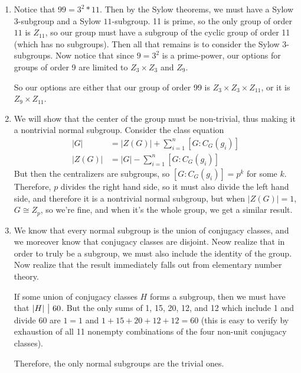 \documentclass[12pt, twosided]{article}
\begin{document}
\begin{enumerate}
\begin{proof}
    Now notice that the former case is just \(Z_3 \times Z_2\), and in the second case \(ab\) is an element of order 6. Then, since there is nowhere else to send \(ba\), we have the result we sought.
  \end{proof}
\item Notice that \(99 = 3^2 * 11\). Then by the Sylow theorems, we must have a Sylow \(3\)-subgroup and a Sylow \(11\)-subgroup. 11 is prime, so the only group of order \(11\) is \(Z_{11}\), so our group must have a subgroup of the cyclic group of order 11 (which has no subgroups). Then all that remains is to consider the Sylow 3-subgroups. Now notice that since \(9 = 3^2\) is a prime-power, our options for groups of order 9 are limited to \(Z_3 \times Z_3\) and \(Z_9\).

  So our options are either that our group of order 99 is \(Z_3 \times Z_3 \times Z_{11}\), or it is \(Z_9 \times Z_{11}\).
\item We will show that the center of the group must be non-trivial, thus making it a nontrivial normal subgroup. Consider the class equation
  \begin{align*}
    |G| &= |Z(G)| + \sum_{i=1}^n[G:C_G(g_i)] \\
    |Z(G)| &= |G| - \sum_{i=1}^n[G:C_G(g_i)]
  \end{align*}
  But then the centralizers are subgroups, so \([G:C_G(g_i)]= p^k\) for some \(k\). Therefore, \(p\) divides the right hand side, so it must also divide the left hand side, and therefore it is a nontrivial normal subgroup, but when \(|Z(G)| = 1\), \(G \cong Z_p\), so we're fine, and when it's the whole group, we get a similar result.
  
\item We know that every normal subgroup is the union of conjugacy classes, and we moreover know that conjugacy classes are disjoint. Neow realize that in order to truly be a subgroup, we must also include the identity of the group. Now realize that the result immediately falls out from elementary number theory.

  If some union of conjugacy classes \(H\) forms a subgroup, then we must have that \(|H| \ \big\vert\  60\). But the only sums of 1, 15, 20, 12, and 12 which include 1 and divide 60 are \(1 = 1\) and \(1 + 15 + 20 + 12 + 12 = 60\) (this is easy to verify by exhaustion of all 11 nonempty combinations of the four non-unit conjugacy classes).

  Therefore, the only normal subgroups are the trivial ones.
 


\end{enumerate}
\end{document}
